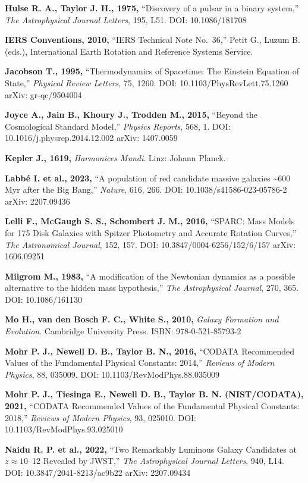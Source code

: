 \documentclass[11pt,a4paper]{article}
\begin{document}
\textbf{Hulse R. A., Taylor J. H., 1975,} ``Discovery of a pulsar in a
binary system,'' \emph{The Astrophysical Journal Letters}, 195, L51.
DOI: 10.1086/181708

\textbf{IERS Conventions, 2010,} ``IERS Technical Note No.~36,'' Petit
G., Luzum B. (eds.), International Earth Rotation and Reference Systems
Service.

\textbf{Jacobson T., 1995,} ``Thermodynamics of Spacetime: The Einstein
Equation of State,'' \emph{Physical Review Letters}, 75, 1260. DOI:
10.1103/PhysRevLett.75.1260 arXiv: gr-qc/9504004

\textbf{Joyce A., Jain B., Khoury J., Trodden M., 2015,} ``Beyond the
Cosmological Standard Model,'' \emph{Physics Reports}, 568, 1. DOI:
10.1016/j.physrep.2014.12.002 arXiv: 1407.0059

\textbf{Kepler J., 1619,} \emph{Harmonices Mundi}. Linz: Johann Planck.

\textbf{Labbé I. et al., 2023,} ``A population of red candidate massive
galaxies \textasciitilde600 Myr after the Big Bang,'' \emph{Nature},
616, 266. DOI: 10.1038/s41586-023-05786-2 arXiv: 2207.09436

\textbf{Lelli F., McGaugh S. S., Schombert J. M., 2016,} ``SPARC: Mass
Models for 175 Disk Galaxies with Spitzer Photometry and Accurate
Rotation Curves,'' \emph{The Astronomical Journal}, 152, 157. DOI:
10.3847/0004-6256/152/6/157 arXiv: 1606.09251

\textbf{Milgrom M., 1983,} ``A modification of the Newtonian dynamics as
a possible alternative to the hidden mass hypothesis,'' \emph{The
Astrophysical Journal}, 270, 365. DOI: 10.1086/161130

\textbf{Mo H., van den Bosch F. C., White S., 2010,} \emph{Galaxy
Formation and Evolution}. Cambridge University Press. ISBN:
978-0-521-85793-2

\textbf{Mohr P. J., Newell D. B., Taylor B. N., 2016,} ``CODATA
Recommended Values of the Fundamental Physical Constants: 2014,''
\emph{Reviews of Modern Physics}, 88, 035009. DOI:
10.1103/RevModPhys.88.035009

\textbf{Mohr P. J., Tiesinga E., Newell D. B., Taylor B. N.
(NIST/CODATA), 2021,} ``CODATA Recommended Values of the Fundamental
Physical Constants: 2018,'' \emph{Reviews of Modern Physics}, 93,
025010. DOI: 10.1103/RevModPhys.93.025010

\textbf{Naidu R. P. et al., 2022,} ``Two Remarkably Luminous Galaxy
Candidates at \(z \approx 10\)--12 Revealed by JWST,'' \emph{The
Astrophysical Journal Letters}, 940, L14. DOI: 10.3847/2041-8213/ac9b22
arXiv: 2207.09434
\end{document}
